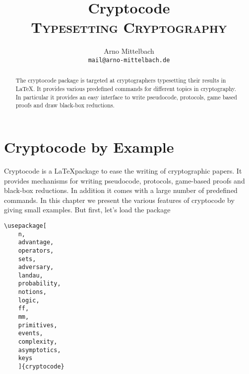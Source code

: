 \documentclass[a4paper]{report}
\author{Arno Mittelbach\\
\texttt{mail@arno-mittelbach.de}}
\title{\Huge Cryptocode \\ \large\textsc{Typesetting Cryptography}}
\begin{document}
\maketitle




\begin{abstract}
\thispagestyle{empty}
The cryptocode package is targeted at cryptographers typesetting their results in \LaTeX. 
It provides various predefined commands for different topics in cryptography.
In particular it provides an easy interface to write pseudocode, protocols, game based proofs 
and draw black-box reductions.

\vspace{2em}
\begin{center}
\end{center}


\end{abstract}
\newpage


\tableofcontents
\thispagestyle{empty}
\newpage

\chapter{Cryptocode by Example}

Cryptocode is a \LaTeX package to ease the writing of cryptographic papers. It provides mechanisms
for writing pseudocode, protocols, game-based proofs and black-box reductions. In addition it comes
with a large number of predefined commands. In this chapter we present the various features of 
cryptocode by giving small examples. But first, let's load the package

\begin{lstlisting}
\usepackage[
	n,
	advantage,
	operators,
	sets,
	adversary,
	landau,
	probability,
	notions,
	logic,
	ff,
	mm,
	primitives,
	events,
	complexity,
	asymptotics,
	keys
	]{cryptocode}
\end{lstlisting}
\end{document}
